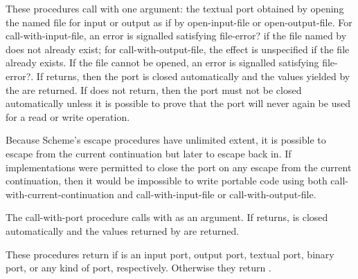 \begin{entry}{%
}

These procedures call  with one argument: the
textual port obtained by opening the named file for input or output
as if by {\cf open-input-file} or {\cf open-output-file}.  
For {\cf call-with-input-file},
an error is signalled satisfying {\cf file-error?} if
the file named by  does not already exist; for
{\cf call-with-output-file},
the effect is unspecified if the file
already exists.
If the
file cannot be opened, an error is signalled satisfying {\cf file-error?}.  If  returns,
then the port is closed automatically and the values yielded by the
 are returned.  If  does not return, then 
the port must not be closed automatically unless it is possible to
prove that the port will never again be used for a read or write
operation.

\begin{rationale}
Because Scheme's escape procedures have unlimited extent, it  is
possible to escape from the current continuation but later to escape back in. 
If implementations were permitted to close the port on any escape from the
current continuation, then it would be impossible to write portable code using
both {\cf call-with-current-continuation} and {\cf call-with-input-file} or
{\cf call-with-output-file}.
\end{rationale} 
\end{entry}

\begin{entry}{%
}


The {\cf call-with-port}
procedure calls  with  as an argument.  If
 returns,  is closed automatically and the values
returned by  are returned.

\end{entry}

\begin{entry}{%
}

These procedures return \schtrue{} if  is an input port, output port, 
textual port, binary port, or any
kind of port, respectively.  Otherwise they return \schfalse.

\end{entry}


